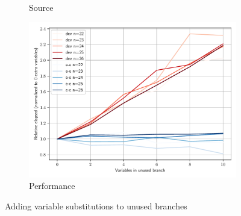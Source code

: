 \documentclass{beamer}
\begin{document}
\begin{frame}[allowframebreaks]
  \begin{figure}
    \begin{subfigure}[b]{0.45\textwidth}
      \centering
      \tiny
      \caption{Source}
      \label{fig:perf-fib-more-branches}
    \end{subfigure}
    \qquad
    \begin{subfigure}[b]{0.45\textwidth}
      \includegraphics[width=\textwidth]{thesis/img/perf_fib_more_branches.pdf}
      \caption{Performance}
      \label{fig:perf-fib-more-branches-graph}
    \end{subfigure}
    \caption{Adding variable substitutions to unused branches}
  \end{figure}
\end{frame}
\end{document}
